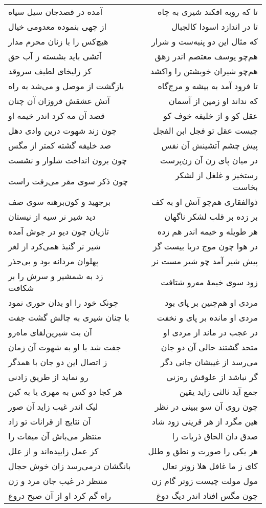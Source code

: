 \begin{center}
\begin{longtable}{l p{0.5cm} r}
آمده در قصدجان سیل سیاه
&&
تا که روبه افکند شیری به چاه
\\
از چهی بنموده معدومی خیال
&&
تا در اندازد اسودا کالجبال
\\
هیچ‌کس را با زنان محرم مدار
&&
که مثال این دو پنبه‌ست و شرار
\\
آتشی باید بشسته ز آب حق
&&
هم‌چو یوسف معتصم اندر زهق
\\
کز زلیخای لطیف سروقد
&&
هم‌چو شیران خویشتن را واکشد
\\
بازگشت از موصل و می‌شد به راه
&&
تا فرود آمد به بیشه و مرج‌گاه
\\
آتش عشقش فروزان آن چنان
&&
که نداند او زمین از آسمان
\\
قصد آن مه کرد اندر خیمه او
&&
عقل کو و از خلیفه خوف کو
\\
چون زند شهوت درین وادی دهل
&&
چیست عقل تو فجل ابن الفجل
\\
صد خلیفه گشته کمتر از مگس
&&
پیش چشم آتشینش آن نفس
\\
چون برون انداخت شلوار و نشست
&&
در میان پای زن آن زن‌پرست
\\
چون ذکر سوی مقر می‌رفت راست
&&
رستخیز و غلغل از لشکر بخاست
\\
برجهید و کون‌برهنه سوی صف
&&
ذوالفقاری هم‌چو آتش او به کف
\\
دید شیر نر سیه از نیستان
&&
بر زده بر قلب لشکر ناگهان
\\
تازیان چون دیو در جوش آمده
&&
هر طویله و خیمه اندر هم زده
\\
شیر نر گنبذ همی‌کرد از لغز
&&
در هوا چون موج دریا بیست گز
\\
پهلوان مردانه بود و بی‌حذر
&&
پیش شیر آمد چو شیر مست نر
\\
زد به شمشیر و سرش را بر شکافت
&&
زود سوی خیمهٔ مه‌رو شتافت
\\
چونک خود را او بدان حوری نمود
&&
مردی او هم‌چنین بر پای بود
\\
با چنان شیری به چالش گشت جفت
&&
مردی او مانده بر پای و نخفت
\\
آن بت شیرین‌لقای ماه‌رو
&&
در عجب در ماند از مردی او
\\
جفت شد با او به شهوت آن زمان
&&
متحد گشتند حالی آن دو جان
\\
ز اتصال این دو جان با همدگر
&&
می‌رسد از غیبشان جانی دگر
\\
رو نماید از طریق زادنی
&&
گر نباشد از علوقش ره‌زنی
\\
هر کجا دو کس به مهری یا به کین
&&
جمع آید ثالثی زاید یقین
\\
لیک اندر غیب زاید آن صور
&&
چون روی آن سو ببینی در نظر
\\
آن نتایج از قرانات تو زاد
&&
هین مگرد از هر قرینی زود شاد
\\
منتظر می‌باش آن میقات را
&&
صدق دان الحاق ذریات را
\\
کز عمل زاییده‌اند و از علل
&&
هر یکی را صورت و نطق و طلل
\\
بانگشان درمی‌رسد زان خوش حجال
&&
کای ز ما غافل هلا زوتر تعال
\\
منتظر در غیب جان مرد و زن
&&
مول مولت چیست زوتر گام زن
\\
راه گم کرد او از آن صبح دروغ
&&
چون مگس افتاد اندر دیگ دوغ
\\
\end{longtable}
\end{center}
